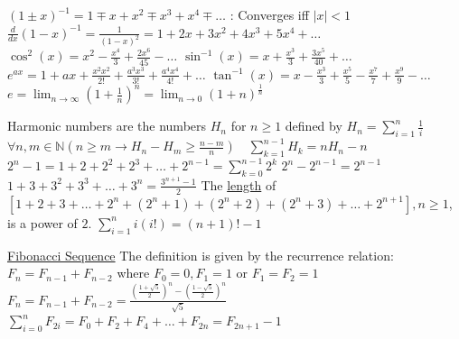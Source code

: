 \documentclass[12pt]{article}
\begin{document}
\begin{flushleft}
	\textbullet \quad $\displaystyle (1 \pm x)^{-1} = 1 \mp x + x^2 \mp x^3 + x^4 \mp \ldots $  :  Converges iff $|x| < 1$ \linebreak 
	\textbullet \quad $\displaystyle \frac{d}{dx}(1-x)^{-1} = \frac{1}{(1-x)^2} = 1 +2x + 3x^2 +4x^3 +5x^4 +\ldots $ \linebreak 
	\textbullet \quad $\displaystyle \cos ^2(x) = x^2 -\frac{x^4}{3} + \frac{2x^6}{45} - \ldots $ \linebreak 
	\textbullet \quad $\displaystyle \sin ^{-1}(x) = x + \frac{x^3}{3} + \frac{3x^5}{40} + \ldots $ \linebreak 
	\textbullet \quad $\displaystyle e^{ax} = 1 + ax + \frac{x^2x^2}{2!} + \frac{a^3x^3}{3!} + \frac{a^4x^4}{4!} + \ldots $ \linebreak 
	\textbullet \quad $\displaystyle \tan^{-1}(x) = x -\frac{x^3}{3} + \frac{x^5}{5} -\frac{x^7}{7} + \frac{x^9}{9} -\ldots $ \linebreak 
	\textbullet \quad $\displaystyle e = \lim_{n\to\infty} \left(1 + \frac{1}{n} \right)^n = \lim_{n\to 0} \left(1 + n \right)^\frac{1}{n} $ \linebreak 
	
		\textbullet \quad Harmonic numbers are the numbers $H_n$ for $n\geq 1$ defined by $H_n = \sum \limits_{i=1}^n \frac{1}{i}$ \\ $\forall n,m \in \mathbb{N} \left(n\geq m \rightarrow H_n -H_m \geq \frac{n-m}{n} \right) \quad \sum \limits_{k=1}^{n-1} H_k = nH_n -n $ \linebreak 
	\textbullet \quad $ 2^n -1 = 1 + 2 + 2^2 +2^3 +\ldots + 2^{n-1} = \sum \limits_{k=0}^{n-1} 2^k $ \linebreak 
	\textbullet \quad $ 2^n -2^{n-1} = 2^{n-1} $ \linebreak 
	\textbullet \quad $\displaystyle  1 + 3 + 3^2 +3^3 + \ldots + 3^n = \frac{3^{n+1}-1}{2} $ \linebreak 
	\textbullet \quad The \uline{length} of $[1+2+3+\ldots +2^n +(2^n+1) +(2^n+2) +(2^n+3)+\ldots +2^{n+1} ], n\geq 1 $, is a power of $2$. \linebreak 
	\textbullet \quad $\sum \limits_{i=1}^n i(i!) = (n+1)! - 1$ \linebreak 
	
	\uline{Fibonacci Sequence} \linebreak 	
	\textbullet \quad The definition is given by the recurrence relation: $\displaystyle F_{n} = F_{n-1} + F_{n-2}$ \linebreak 
	where $\displaystyle  F_0 = 0, F_1 = 1 $ or $\displaystyle F_1 = F_2 = 1$ \linebreak 
	\textbullet \quad $\displaystyle F_n = F_{n-1} + F_{n-2} = \frac{(\frac{1+\sqrt{5}}{2})^n-(\frac{1-\sqrt{5}}{2})^n}{\sqrt{5}}	$ \linebreak 
	\textbullet \quad $\sum \limits_{i=0}^n F_{2i} = F_0 + F_2 + F_4 +\ldots+F_{2n} = F_{2n+1} -1$ \linebreak 
	

\end{flushleft}
\end{document}
